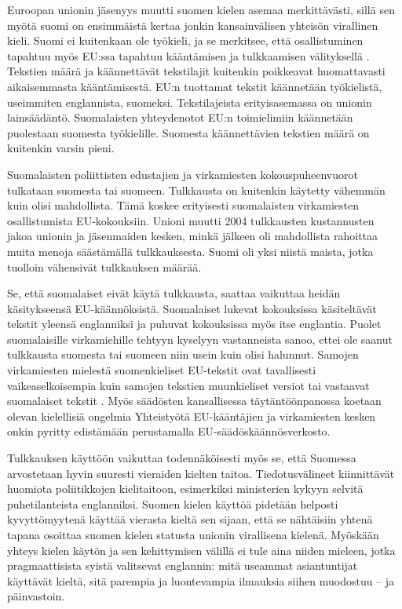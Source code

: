 \documentclass{../../metanetpaper}
\begin{document}
\begin{Parallel}[c]{79mm}{78mm}
{Euroopan unionin jäsenyys muutti suomen kielen asemaa merkittävästi,
sillä sen myötä suomi on ensimmäistä kertaa jonkin kansainvälisen
yhteisön virallinen kieli. Suomi ei kuitenkaan ole työkieli, ja se
merkitsee, että osallistuminen tapahtuu myös EU:ssa tapahtuu
kääntämisen ja tulkkaamisen välityksellä \cite{Tulevaisuus2009}.
Tekstien määrä ja käännettävät tekstilajit kuitenkin poikkeavat
huomattavasti aikaisemmasta kääntämisestä. EU:n tuottamat tekstit
käännetään työkielistä, useimmiten englannista, suomeksi.
Tekstilajeista erityisasemassa on unionin lainsäädäntö. Suomalaisten
yhteydenotot EU:n toimielimiin käännetään puolestaan suomesta
työkielille. Suomesta käännettävien tekstien määrä on kuitenkin varsin
pieni.

Suomalaisten poliittisten edustajien ja virkamiesten
kokouspuheenvuorot tulkataan suomesta tai suomeen. Tulkkausta on
kuitenkin käytetty vähemmän kuin olisi mahdollista. Tämä koskee
erityisesti suomalaisten virkamiesten osallistumista
EU-kokouksiin. Unioni muutti 2004 tulkkausten kustannusten jakoa
unionin ja jäsenmaiden kesken, minkä jälkeen oli mahdollista rahoittaa
muita menoja säästämällä tulkkauksesta. Suomi oli yksi niistä maista,
jotka tuolloin vähensivät tulkkauksen määrää.

Se, että suomalaiset eivät käytä tulkkausta, saattaa vaikuttaa heidän
käsitykseensä EU-käännöksistä. Suomalaiset lukevat kokouksissa
käsiteltävät tekstit yleensä englanniksi ja puhuvat kokouksissa myös
itse englantia. Puolet suomalaisille virkamiehille tehtyyn kyselyyn
vastanneista sanoo, ettei ole saanut tulkkausta suomesta tai suomeen
niin usein kuin olisi halunnut. Samojen virkamiesten mielestä
suomenkieliset EU-tekstit ovat tavallisesti vaikeaselkoisempia kuin
samojen tekstien muunkieliset versiot tai vastaavat suomalaiset
tekstit \cite{Piehl2008}. Myös säädösten kansallisessa
täytäntöönpanossa koetaan olevan kielellisiä ongelmia
\cite{OECD2010} Yhteistyötä EU-kääntäjien ja virkamiesten kesken
onkin pyritty edistämään perustamalla EU-säädöskäännösverkosto.

Tulkkauksen käyttöön vaikuttaa todennäköisesti myös se, että Suomessa
arvostetaan hyvin suuresti vieraiden kielten taitoa. Tiedotusvälineet
kiinnittävät huomiota poliitikkojen kielitaitoon, esimerkiksi
ministerien kykyyn selvitä puhetilanteista englanniksi. Suomen kielen
käyttöä pidetään helposti kyvyttömyytenä käyttää vierasta kieltä sen
sijaan, että se nähtäisiin yhtenä tapana osoittaa suomen kielen
statusta unionin virallisena kielenä.  Myöskään yhteys kielen käytön
ja sen kehittymisen välillä ei tule aina niiden mieleen, jotka
pragmaattisista syistä valitsevat englannin: mitä useammat
asiantuntijat käyttävät kieltä, sitä parempia ja luontevampia
ilmauksia siihen muodostuu – ja päinvastoin.

}
\end{Parallel}
\end{document}
